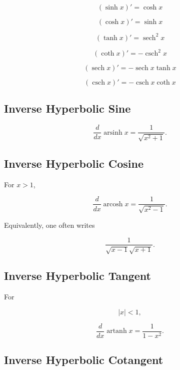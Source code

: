 \[
\boxed{
(\sinh x)'=\cosh x
}
\]

\[
\boxed{
(\cosh x)'=\sinh x
}
\]

\[
\boxed{
(\tanh x)'=\operatorname{sech}^2x
}
\]

\[
\boxed{
(\coth x)'=-\operatorname{csch}^2x
}
\]

\[
\boxed{
(\operatorname{sech}x)'
=
-\operatorname{sech}x\tanh x
}
\]

\[
\boxed{
(\operatorname{csch}x)'
=
-\operatorname{csch}x\coth x
}
\]

\subsection{Inverse Hyperbolic Sine}
\label{subsec:inverse-sinh-derivative}

\[
\boxed{
\frac{d}{dx}
\operatorname{arsinh}x
=
\frac{
1
}{
\sqrt{x^2+1}
}.
}
\]

\subsection{Inverse Hyperbolic Cosine}
\label{subsec:inverse-cosh-derivative}

For \(x>1\),

\[
\boxed{
\frac{d}{dx}
\operatorname{arcosh}x
=
\frac{
1
}{
\sqrt{x^2-1}
}.
}
\]

Equivalently, one often writes

\[
\boxed{
\frac{1}{
\sqrt{x-1}\sqrt{x+1}
}.
}
\]

\subsection{Inverse Hyperbolic Tangent}
\label{subsec:inverse-tanh-derivative}

For

\[
|x|<1,
\]

\[
\boxed{
\frac{d}{dx}
\operatorname{artanh}x
=
\frac{1}{1-x^2}.
}
\]

\subsection{Inverse Hyperbolic Cotangent}
\label{subsec:inverse-coth-derivative}

